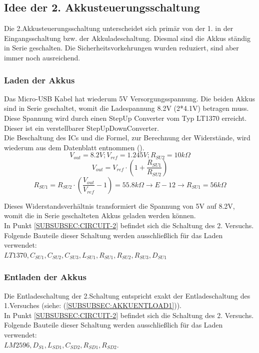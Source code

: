 \documentclass[12pt,a4paper]{article}
\begin{document}
{\newpage
\subsection{Idee der 2. Akkusteuerungsschaltung}
\label{SUBSEC:AKKUSTEUR2}

Die 2.Akkusteuerungsschaltung unterscheidet sich primär von der 1. in der Eingangsschaltung bzw. der Akkuladeschaltung. Diesmal sind die Akkus ständig in Serie geschalten. Die Sicherheitsvorkehrungen wurden reduziert, sind aber immer noch ausreichend.

\subsubsection{Laden der Akkus}
\label{SUBSUBSEC:AKKULOAD2}

Das Micro-USB Kabel hat wiederum 5V Versorgungsspannung. Die beiden Akkus sind in Serie geschaltet, womit die Ladespannung 8.2V (2*4.1V) betragen muss. Diese Spannung wird durch einen StepUp Converter vom Typ LT1370 erreicht. Dieser ist ein verstellbarer StepUpDownConverter. \\
Die Beschaltung des ICs und die Formel, zur Berechnung der Widerstände, wird wiederum aus dem Datenblatt entnommen (\cite{LT1370}). \\
\[V_{out}=8.2V;V_{ref}=1.245V;R_{SU2}=10k\Omega\]
\[V_{out}=V_{ref} \cdot \left( 1 + \frac{R_{SU1}}{R_{SU2}} \right)\]
\[R_{SU1} = R_{SU2} \cdot \left( \frac{V_{out}}{V_{ref}} - 1 \right) = 55.8 k\Omega \rightarrow E-12 \rightarrow R_{SU1} = 56 k \Omega\]

\vspace{1cm}
Dieses Widerstandsverhältnis transformiert die Spannung von 5V auf 8.2V, womit die in Serie geschalteten Akkus geladen werden können.  \\
In Punkt \ref{SUBSUBSEC:CIRCUIT-2} befindet sich die Schaltung des 2. Versuchs. Folgende Bauteile dieser Schaltung werden ausschließlich für das Laden verwendet:\\ $LT1370,C_{SU1},C_{SU2},C_{SU3}, L_{SU1},R_{SU1},R_{SU2},R_{SU3},D_{SU1}$ 

\subsubsection{Entladen der Akkus}
\label{SUBSUBSEC:AKKUENTLOAD2}

Die Entladeschaltung der 2.Schaltung entspricht exakt der Entladeschaltung des 1.Versuches (siehe:  (\ref{SUBSUBSEC:AKKUENTLOAD1})).\\
In Punkt \ref{SUBSUBSEC:CIRCUIT-2} befindet sich die Schaltung des 2. Versuchs. Folgende Bauteile dieser Schaltung werden ausschließlich für das Laden verwendet:\\ $LM2596,D_{S1},L_{SD1},C_{SD2},R_{SD1},R_{SD2}$. 
\newpage

}
\end{document}
